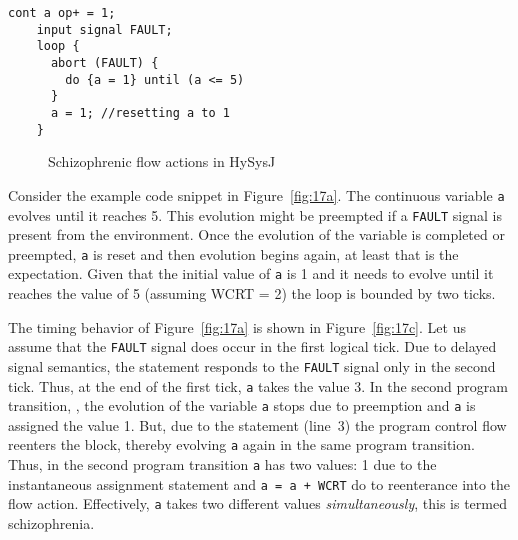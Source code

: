 \documentclass[10pt,journal,cspaper,compsoc]{IEEEtran}
\begin{document}
\newbox{\schone}
\begin{lrbox}{\schone}
  \begin{lstlisting}[mathescape,style=sysj,morekeywords={until,wait_inbetween,
      cont,input,signal,loop,abort,await,emit,present,trap,pause,exit,delay,suspend}]
    cont a op+ = 1;
    input signal FAULT;
    loop {
      abort (FAULT) {
        do {a = 1} until (a <= 5)
      }
      a = 1; //resetting a to 1
    }
  \end{lstlisting}
\end{lrbox}

\begin{figure}[t!]
  \centering
  \hspace{20pt}
  
  \hspace{20pt}
  \caption{Schizophrenic flow actions in HySysJ}
  \label{fig:17}
\end{figure}

Consider the example code snippet in Figure~\ref{fig:17a}. The
continuous variable \texttt{a} evolves until it reaches 5. This
evolution might be preempted if a \texttt{FAULT} signal is present from
the environment. Once the evolution of the variable is completed or
preempted, \texttt{a} is reset and then evolution begins again, at least
that is the expectation. Given that the initial value of \texttt{a} is 1
and it needs to evolve until it reaches the value of 5 (assuming WCRT =
2) the loop is bounded by two ticks.

The timing behavior of Figure~\ref{fig:17a} is shown in
Figure~\ref{fig:17c}. Let us assume that the \texttt{FAULT} signal does
occur in the first logical tick. Due to delayed signal semantics, the
 statement responds to the \texttt{FAULT} signal only in
the second tick. Thus, at the end of the first tick, \texttt{a} takes
the value 3. In the second program transition, , the evolution of
the variable \texttt{a} stops due to preemption and \texttt{a} is
assigned the value 1. But, due to the  statement (line~3)
the program control flow reenters the  
block, thereby evolving \texttt{a} again in the same program
transition. Thus, in the second program transition \texttt{a} has two
values: 1 due to the instantaneous assignment statement and \texttt{a =
  a + WCRT} do to reenterance into the flow action. Effectively,
\texttt{a} takes two different values \textit{simultaneously}, this is
termed schizophrenia.
\end{document}
